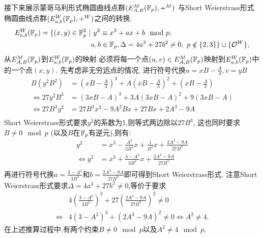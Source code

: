 接下来展示蒙哥马利形式椭圆曲线点群$(E_{A,B}^M(\mathbb{F}_p), +^M)$
与Short Weierstrass形式椭圆曲线点群$(E_{a,b}^{W}(\mathbb{F}_p), +^W)$之间的转换.
\begin{equation*}
\begin{split}
E_{a,b}^{W}(\mathbb{F}_p)= \{(x,y)\in \mathbb{F}_p^2\ | & \ y^2 \equiv x^3 + ax + b \mod p, \\
 & a, b \in \mathbb{F}_p, \Delta = 4a^3 + 27b^2 \neq 0, \ p \notin \{2,3\}\} \cup \{\mathcal{O}^W\},
\end{split}
\end{equation*}
从$E_{A,B}^M(\mathbb{F}_p)$到$E_{a,b}^{W}(\mathbb{F}_p)$的映射
必须将每一个点$(u,v)\in E_{A,B}^M(\mathbb{F}_p)$映射到$E_{a,b}^{W}(\mathbb{F}_p)$中的一个点$(x,y)$.
先考虑非无穷远点的情况.
进行符号代换$u = xB - \frac{A}{3}, v = yB$
\begin{equation*}
\begin{split}
B\left(y^2B^2\right) & = \left( xB - \frac{A}{3} \right)^3 + 
A \left( xB - \frac{A}{3} \right)^2 +  \left(xB - \frac{A}{3}\right) \\
\iff 
27 y^2 B^3 & = (3xB - A)^3 + 3A(3xB-A)^2 + 9(3xB - A) \\
\iff 
27 B^3 y^2 & = 27B^3x^3 - 9A^2Bx + 27Bx + 2A^3 - 9A \\
\end{split}
\end{equation*}
Short Weierstrass形式要求$y^2$的系数为1,则等式两边除以$27B^3$,
这也同时要求$B\neq 0\mod p$ (以及$B$在$\mathbb{F}_p$有逆元),则有:
\begin{equation*}
\begin{split}
y^2 & = x^3 - \frac{A^2}{3B^2}x + \frac{1}{B^2}x + \frac{2A^3 - 9A}{27B^3} \\
\iff 
y^2 & = x^3 + \frac{3-A^2}{3B^2} x + \frac{2A^3 - 9A}{27B^3} \\
\end{split}
\end{equation*}
再进行符号代换$a = \frac{3-A^2}{3B^2}$和$b = \frac{2A^3 - 9A}{27B^3}$即可得到Short Weierstrass形式.
注意Short Weierstrass形式要求$\Delta = 4a^3 + 27b^2 \neq 0$,等价于要求
\begin{equation*}
\begin{split}
& 4\left(\frac{3-A^2}{3B^2}\right)^3  + 27\left(  \frac{2A^3 - 9A}{27B^3} \right)^2  \neq 0 \\
\iff 
& 4\left(3-A^2\right)^3 + \left(  2A^3 - 9A \right)^2 \neq 0 \iff  A^2 \neq 4.
\end{split}
\end{equation*}
在上述推算过程中,有两个约束$B\neq 0\mod p$以及$A^2\neq 4\mod p$,
